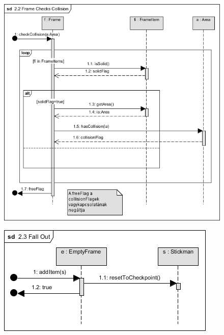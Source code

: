 		\begin{figure}[ht!]
			\begin{center}
				\includegraphics[scale=0.8]{resources/seq_2-2_frameChecksCollision.png}
				\caption{}
			\end{center}
		\end{figure}
		
		\begin{figure}[ht!]
			\begin{center}
				\includegraphics[scale=0.8]{resources/seq_2-3_fallOut.png}
				\caption{}
			\end{center}
		\end{figure}
		
